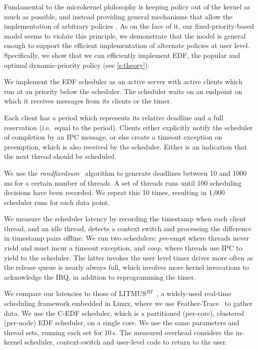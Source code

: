 Fundamental to the microkernel philosophy is keeping policy out of the
kernel as much as possible, and instead providing general mechanisms
that allow the implementation of arbitrary policies
\citep{Heiser_Elphinstone_16}.  As on the face of it, our
fixed-priority-based model seems to violate this principle,  we
demonstrate that the model is general enough to support the efficient
implementation of alternate policies at user level. Specifically, we
show that we can efficiently implement \gls{EDF}, the popular and  optimal dynamic-priority policy (see \autoref{s:theory}).

We implement the EDF scheduler as an active server with active
clients which run at an \selfour priority below the scheduler.
The scheduler waits on an endpoint on which it receives messages from
its clients or the timer.

Each client has a period which represents its relative deadline and a full reservation (i.e.\ equal to the period). Clients
either explicitly notify the scheduler of completion by an IPC
message, or else create a timeout exception on preemption, which is also received by the
scheduler. Either is an indication that the next thread should be scheduled.

We use the \emph{randfixedsum}~\citep{Emberson_SD_10} algorithm to
generate deadlines between 10 and 1000\,ms for a certain number of threads.
A set of threads runs until 100
scheduling decisions have been recorded. We repeat this 10 times,
resulting in 1,000 scheduler runs for each data point.

We measure the scheduler latency by recording the timestamp when each client thread, and an idle
thread, detects a
context switch and processing the difference in timestamp pairs offline. We run two schedulers:
\emph{pre}-empt where threads never yield and must incur a timeout exception, and \emph{coop}, where
threads use IPC to yield to the scheduler. The latter invokes the user level timer
driver more often as the release queue is nearly always full, which involves more kernel invocations
to acknowledge the IRQ, in addition to reprogramming the timer.

We compare our latencies to those of
LITMUS$^{RT}$~\citep{Calandrino_LBDA_07}, a widely-used real-time scheduling
framework embedded in Linux, where we use Feather-Trace~\citep{Brandenburg_Anderson_07} to gather data.
We use the C-EDF scheduler, which is a partitioned (per-core), clustered (per-node) EDF scheduler, on a single
core. We use the same parameters and thread sets, running each set for 10\,s. 
The measured overhead considers the in-kernel scheduler, context-switch and user-level code to return to
the user.


